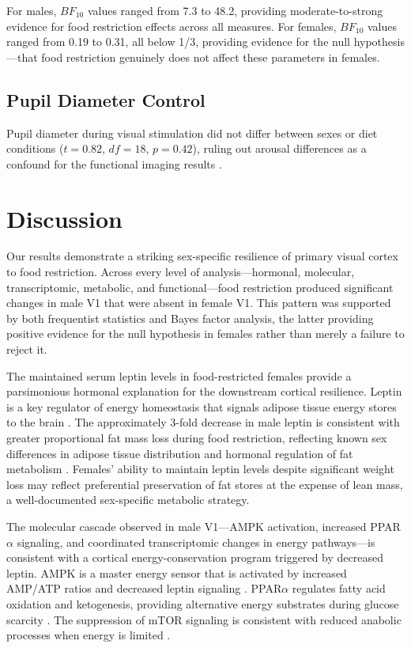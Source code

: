 \documentclass[11pt]{article}
\begin{document}
For males, $BF_{10}$ values ranged from 7.3 to 48.2, providing moderate-to-strong evidence for food restriction effects across all measures. For females, $BF_{10}$ values ranged from 0.19 to 0.31, all below 1/3, providing evidence for the null hypothesis---that food restriction genuinely does not affect these parameters in females.

\subsection{Pupil Diameter Control}

Pupil diameter during visual stimulation did not differ between sexes or diet conditions ($t = 0.82$, $df = 18$, $p = 0.42$), ruling out arousal differences as a confound for the functional imaging results \citep{pupil_control2019}.

\section{Discussion}

Our results demonstrate a striking sex-specific resilience of primary visual cortex to food restriction. Across every level of analysis---hormonal, molecular, transcriptomic, metabolic, and functional---food restriction produced significant changes in male V1 that were absent in female V1. This pattern was supported by both frequentist statistics and Bayes factor analysis, the latter providing positive evidence for the null hypothesis in females rather than merely a failure to reject it.

The maintained serum leptin levels in food-restricted females provide a parsimonious hormonal explanation for the downstream cortical resilience. Leptin is a key regulator of energy homeostasis that signals adipose tissue energy stores to the brain \citep{leptin_brain2011, leptin_resistance2016}. The approximately 3-fold decrease in male leptin is consistent with greater proportional fat mass loss during food restriction, reflecting known sex differences in adipose tissue distribution and hormonal regulation of fat metabolism \citep{leptin_sex_diff2015, sex_diff_metabolism2009}. Females' ability to maintain leptin levels despite significant weight loss may reflect preferential preservation of fat stores at the expense of lean mass, a well-documented sex-specific metabolic strategy.

The molecular cascade observed in male V1---AMPK activation, increased PPAR$\alpha$ signaling, and coordinated transcriptomic changes in energy pathways---is consistent with a cortical energy-conservation program triggered by decreased leptin. AMPK is a master energy sensor that is activated by increased AMP/ATP ratios and decreased leptin signaling \citep{ampk_brain2009}. PPAR$\alpha$ regulates fatty acid oxidation and ketogenesis, providing alternative energy substrates during glucose scarcity \citep{ppara_neuro2015}. The suppression of mTOR signaling is consistent with reduced anabolic processes when energy is limited \citep{mtor_signaling2012}.
\end{document}
